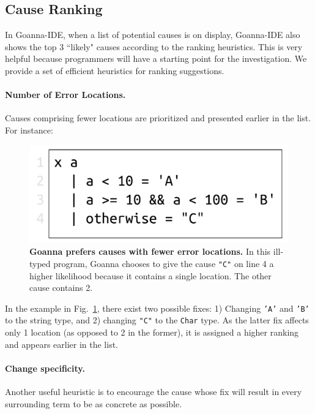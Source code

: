 \documentclass[pdflatex,sn-mathphys-num]{sn-jnl}%
\begin{document}
    \subsection{Cause Ranking} \label{sub:ranking}
     In Goanna-IDE, when a list of potential causes is on display, Goanna-IDE also shows the top 3 ``likely" causes according to the ranking heuristics. This is very helpful because programmers will have a starting point for the investigation. We provide a set of efficient heuristics for ranking suggestions. 

    \paragraph{Number of Error Locations.}
    Causes comprising fewer locations are prioritized and presented earlier in the list. For instance:
   \begin{figure}[ht!]
        \centering
        \includegraphics[width=0.5\linewidth]{images/Loc-Count}
        \caption[Goanna prefers causes with fewer error locations]{\textbf{Goanna prefers causes with fewer error locations.} In this ill-typed program, Goanna chooses to give the cause \texttt{"C"} on line 4 a higher likelihood because it contains a single location. The other cause contains 2. }
        \label{fig:loc-count}
    \end{figure}

    In the example in Fig.~\ref{fig:loc-count}, there exist two possible fixes: 1) Changing \texttt{'A'} and \texttt{'B'} to the string type, and 2) changing \texttt{"C"} to the \texttt{Char} type. As the latter fix affects only 1 location (as opposed to 2 in the former), it is assigned a higher ranking and appears earlier in the list.

    \paragraph{Change specificity.}
	Another useful heuristic is to encourage the cause whose fix will result in every surrounding term to be as concrete as possible.
	
\end{document}
